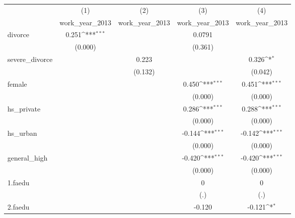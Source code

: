 {
\def\sym#1{\ifmmode^{#1}\else\(^{#1}\)\fi}
\begin{tabular}{l*{4}{c}}
\hline\hline
            &\multicolumn{1}{c}{(1)}&\multicolumn{1}{c}{(2)}&\multicolumn{1}{c}{(3)}&\multicolumn{1}{c}{(4)}\\
            &\multicolumn{1}{c}{work\_year\_2013}&\multicolumn{1}{c}{work\_year\_2013}&\multicolumn{1}{c}{work\_year\_2013}&\multicolumn{1}{c}{work\_year\_2013}\\
\hline
divorce     &       0.251\sym{***}&                     &      0.0791         &                     \\
            &     (0.000)         &                     &     (0.361)         &                     \\
[1em]
severe\_divorce&                     &       0.223         &                     &       0.326\sym{*}  \\
            &                     &     (0.132)         &                     &     (0.042)         \\
[1em]
female      &                     &                     &       0.450\sym{***}&       0.451\sym{***}\\
            &                     &                     &     (0.000)         &     (0.000)         \\
[1em]
hs\_private  &                     &                     &       0.286\sym{***}&       0.288\sym{***}\\
            &                     &                     &     (0.000)         &     (0.000)         \\
[1em]
hs\_urban    &                     &                     &      -0.144\sym{***}&      -0.142\sym{***}\\
            &                     &                     &     (0.000)         &     (0.000)         \\
[1em]
general\_high&                     &                     &      -0.420\sym{***}&      -0.420\sym{***}\\
            &                     &                     &     (0.000)         &     (0.000)         \\
[1em]
1.faedu     &                     &                     &           0         &           0         \\
            &                     &                     &         (.)         &         (.)         \\
[1em]
2.faedu     &                     &                     &      -0.120         &      -0.121\sym{*}  \\

\end{tabular}}
